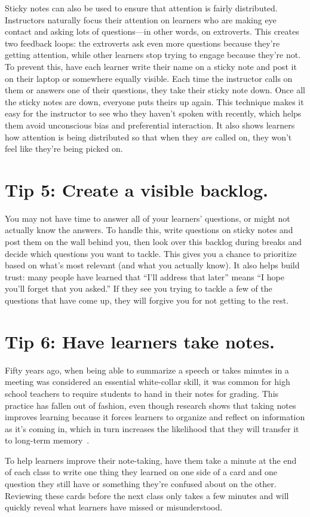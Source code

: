 \documentclass[10pt,letterpaper]{article}
\newcommand{\rulemajor}[1]{\section{#1}}
\begin{document}
Sticky notes can also be used to ensure that attention is fairly distributed.
Instructors naturally focus their attention on learners
who are making eye contact and asking lots of questions---in other words, on extroverts.
This creates two feedback loops:
the extroverts ask even more questions because they're getting attention,
while other learners stop trying to engage because they're not.
To prevent this,
have each learner write their name on a sticky note
and post it on their laptop or somewhere equally visible.
Each time the instructor calls on them or answers one of their questions,
they take their sticky note down.
Once all the sticky notes are down,
everyone puts theirs up again.
This technique makes it easy for the instructor to see who they haven't spoken with recently,
which helps them avoid unconscious bias and preferential interaction.
It also shows learners how attention is being distributed
so that when they \emph{are} called on,
they won't feel like they're being picked on.

\rulemajor{Tip 5: Create a visible backlog.}

You may not have time to answer all of your learners' questions,
or might not actually know the answers.
To handle this,
write questions on sticky notes and post them on the wall behind you,
then look over this backlog during breaks and decide which questions you want to tackle.
This gives you a chance to prioritize based on what's most relevant (and what you actually know).
It also helps build trust:
many people have learned that ``I'll address that later''
means ``I hope you'll forget that you asked.''
If they see you trying to tackle a few of the questions that have come up,
they will forgive you for not getting to the rest.

\rulemajor{Tip 6: Have learners take notes.}

Fifty years ago,
when being able to summarize a speech or takes minutes in a meeting
was considered an essential white-collar skill,
it was common for high school teachers to require students to hand in their notes for grading.
This practice has fallen out of fashion,
even though research shows that taking notes improves learning
because it forces learners to organize and reflect on information as it's coming in,
which in turn increases the likelihood that they will transfer it to long-term memory~\cite{Aike1975,Boha2011}.

To help learners improve their note-taking,
have them take a minute at the end of each class
to write one thing they learned on one side of a card
and one question they still have or something they're confused about on the other.
Reviewing these cards before the next class only takes a few minutes
and will quickly reveal what learners have missed or misunderstood.
\end{document}
